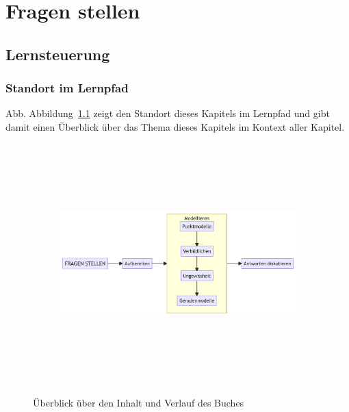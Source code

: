\documentclass[
  a4paper,
  DIV=11]{scrreprt}
\theoremstyle{definition}
\theoremstyle{definition}
\theoremstyle{remark}
\begin{document}

\hypertarget{fragen-stellen}{%
\chapter{Fragen stellen}\label{fragen-stellen}}

\hypertarget{lernsteuerung}{%
\section{Lernsteuerung}\label{lernsteuerung}}

\hypertarget{standort-im-lernpfad}{%
\subsection{Standort im Lernpfad}\label{standort-im-lernpfad}}

Abb. Abbildung~\ref{fig-ueberblick-fragen} zeigt den Standort dieses
Kapitels im Lernpfad und gibt damit einen Überblick über das Thema
dieses Kapitels im Kontext aller Kapitel.

\begin{figure}

{\centering 

\begin{figure}[H]

{\centering \includegraphics[width=8.3in,height=3.65in]{./fragenstellen_files/figure-latex/mermaid-figure-1.png}

}

\end{figure}

}

\caption{\label{fig-ueberblick-fragen}Überblick über den Inhalt und
Verlauf des Buches}

\end{figure}
\end{document}
